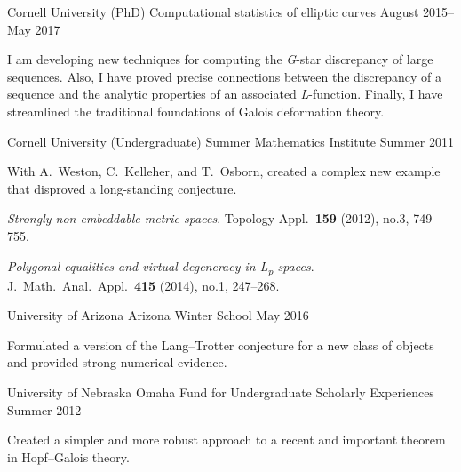 \documentclass[11pt, letterpaper]{awesome-cv}
\begin{document}

\begin{cventries}

\cventry
	{Cornell University (PhD)}
	{Computational statistics of elliptic curves}
	{}
	{August 2015--May 2017}
	{
		\begin{cvitems}
			\item{I am developing new techniques for computing the \emph{G}-star discrepancy of large sequences. Also, I have proved precise connections between the discrepancy of a sequence and the analytic properties of an associated \emph{L}-function. Finally, I have streamlined the traditional foundations of Galois deformation theory.}
		\end{cvitems}
	}
	
\cventry
	{Cornell University (Undergraduate)}
	{Summer Mathematics Institute}
	{}
	{Summer 2011}
	{
		\begin{cvitems}
			\item{With A.~Weston, C.~Kelleher, and T.~Osborn, created a complex new example that disproved a long-standing conjecture.}
			\item{\emph{Strongly non-embeddable metric spaces}. Topology Appl.~\textbf{159} (2012), no.3, 749--755.}
			\item{\emph{Polygonal equalities and virtual degeneracy in L\textsubscript{p} spaces}. J.~Math.~Anal.~Appl.~\textbf{415} (2014), no.1, 247--268.}
		\end{cvitems}
	}
	
\cventry
	{University of Arizona}
	{Arizona Winter School}
	{}
	{May 2016}
	{
		\begin{cvitems}
			\item{Formulated a version of the Lang--Trotter conjecture for a new class of objects and provided strong numerical evidence.}
		\end{cvitems}
	}

\cventry
	{University of Nebraska Omaha}
	{Fund for Undergraduate Scholarly Experiences}
	{}
	{Summer 2012}
	{
		\begin{cvitems}
			\item{Created a simpler and more robust approach to a recent and important theorem in Hopf--Galois theory.}
		\end{cvitems}
	}
	
\end{cventries}





\end{document}
